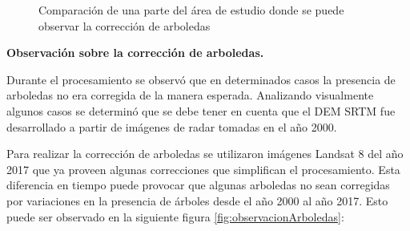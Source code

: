 \documentclass[10pt,a4paper, twoside]{report}
\begin{document}
\begin{figure}[H]
	\centering
	\caption{Comparación de una parte del área de estudio donde se puede observar la corrección de arboledas}
	\label{fig:comparacionArboledas}
\end{figure}

\textbf{Observación sobre la corrección de arboledas.}
\label{obscorreccionArboledas}

Durante el procesamiento se observó que en determinados casos la presencia de arboledas no era corregida de la manera esperada. Analizando visualmente algunos casos se determinó que se debe tener en cuenta que el DEM SRTM fue desarrollado a partir de imágenes de radar tomadas en el año 2000.

Para realizar la corrección de arboledas se utilizaron imágenes Landsat 8 del año 2017 que ya proveen algunas correcciones que simplifican el procesamiento. Esta diferencia en tiempo puede provocar que algunas arboledas no sean corregidas por variaciones en la presencia de árboles desde el año 2000 al año 2017. Esto puede ser observado en la siguiente figura \ref{fig:observacionArboledas}:
\end{document}
